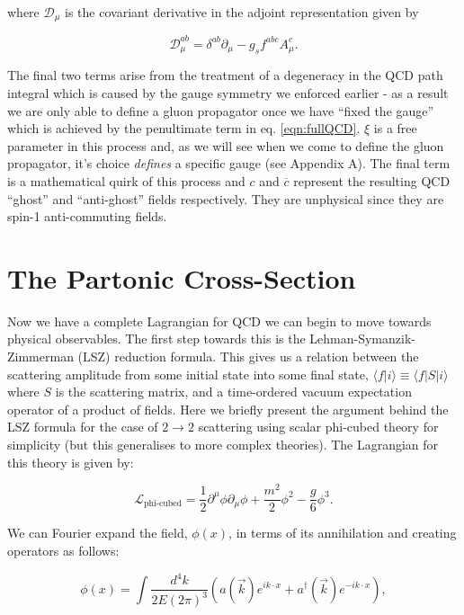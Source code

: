 	where $\mathcal{D}_{\mu}$ is the covariant derivative in the adjoint representation given by

	\begin{equation}
		\mathcal{D}_\mu^{ab} = \delta^{ab}\partial_\mu - g_sf^{abc}A^c_\mu.
	\end{equation}

	The final two terms arise from the treatment of a degeneracy in the QCD path integral which is caused by the gauge symmetry we
	enforced earlier - as a result we are only able to define a gluon propagator once we have ``fixed the gauge'' which is achieved
	by the penultimate term in eq. \eqref{eqn:fullQCD}.  $\xi$ is a free parameter in this process and, as we will see when we come
	to define the gluon propagator, it's choice \emph{defines} a specific gauge (see Appendix A).  The final term is a mathematical
	quirk of this process and $c$ and $\overline{c}$ represent the resulting QCD ``ghost'' and ``anti-ghost'' fields respectively.
	They are unphysical since they are spin-1 anti-commuting fields.

\section{The Partonic Cross-Section}
	\label{sec:partonicCrossSection}

	Now we have a complete Lagrangian for QCD we can begin to move towards physical observables.  The first step towards this
	is the Lehman-Symanzik-Zimmerman (LSZ) reduction formula.  This gives us a relation between the scattering amplitude
	from some initial state into some final state, $\langle f|i\rangle\equiv\langle f|S|i\rangle$ where $S$ is the
	scattering matrix, and a time-ordered vacuum expectation operator of a product of fields.  Here we briefly present
	the argument behind the LSZ formula for the case of $2\rightarrow2$ scattering using scalar phi-cubed theory for simplicity
	(but this generalises to more complex theories). The Lagrangian for this theory is given by:

	\begin{equation}
		\mathcal{L}_{\text{phi-cubed}} = \frac{1}{2}\partial^{\mu}\phi\partial_{\mu}\phi + \frac{m^2}{2}\phi^2 - \frac{g}{6}\phi^3.
		\label{eqn:phi3}
	\end{equation}

	We can Fourier expand the field, $\phi(x)$, in terms of its annihilation and creating operators as follows:

	\begin{equation}
		\phi(x) = \int\frac{d^4k}{2E(2\pi)^3}\left(a(\vec{k})e^{ik\cdot x} + a^\dagger(\vec{k})e^{-ik\cdot x}\right),
	\end{equation}

